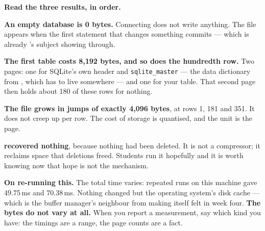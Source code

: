 \begin{measured}
\medskip
\textbf{Read the three results, in order.}

\begin{tight}
  \item \textbf{An empty database is 0 bytes.} Connecting does not write
        anything. The file appears when the first statement that changes
        something commits --- which is already 's subject
        showing through.
  \item \textbf{The first table costs 8{,}192 bytes, and so does the hundredth
        row.} Two pages: one for SQLite's own header and
        \texttt{sqlite\_master} --- the data dictionary from
        , which has to live somewhere --- and one for your
        table. That second page then holds about 180 of these rows for nothing.
  \item \textbf{The file grows in jumps of exactly 4{,}096 bytes}, at rows 1,
        181 and 351. It does not creep up per row. The cost of storage is
        quantised, and the unit is the page.
  \item \textbf{ recovered nothing}, because nothing had been
        deleted. It is not a compressor; it reclaims space that deletions
        freed. Students run it hopefully and it is worth knowing now that
        hope is not the mechanism.
\end{tight}

\smallskip
\textbf{On re-running this.} The total time varies: repeated runs on this
machine gave 49.75\,ms and 70.38\,ms. Nothing changed but the operating
system's disk cache --- which is the buffer manager's neighbour from
 making itself felt in week four. \textbf{The bytes do not
vary at all.} When you report a measurement, say which kind you have: the
timings are a range, the page counts are a fact.
\end{measured}

